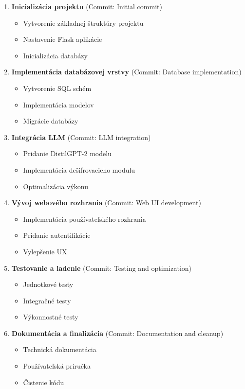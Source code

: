 \documentclass[12pt,a4paper]{article}
\begin{document}
\begin{enumerate}
    \item \textbf{Inicializácia projektu} (Commit: Initial commit)
    \begin{itemize}
        \item Vytvorenie základnej štruktúry projektu
        \item Nastavenie Flask aplikácie
        \item Inicializácia databázy
    \end{itemize}
    
    \item \textbf{Implementácia databázovej vrstvy} (Commit: Database implementation)
    \begin{itemize}
        \item Vytvorenie SQL schém
        \item Implementácia modelov
        \item Migrácie databázy
    \end{itemize}
    
    \item \textbf{Integrácia LLM} (Commit: LLM integration)
    \begin{itemize}
        \item Pridanie DistilGPT-2 modelu
        \item Implementácia dešifrovacieho modulu
        \item Optimalizácia výkonu
    \end{itemize}
    
    \item \textbf{Vývoj webového rozhrania} (Commit: Web UI development)
    \begin{itemize}
        \item Implementácia používateľského rozhrania
        \item Pridanie autentifikácie
        \item Vylepšenie UX
    \end{itemize}
    
    \item \textbf{Testovanie a ladenie} (Commit: Testing and optimization)
    \begin{itemize}
        \item Jednotkové testy
        \item Integračné testy
        \item Výkonnostné testy
    \end{itemize}
    
    \item \textbf{Dokumentácia a finalizácia} (Commit: Documentation and cleanup)
    \begin{itemize}
        \item Technická dokumentácia
        \item Používateľská príručka
        \item Čistenie kódu
    \end{itemize}
\end{enumerate}
\end{document}
